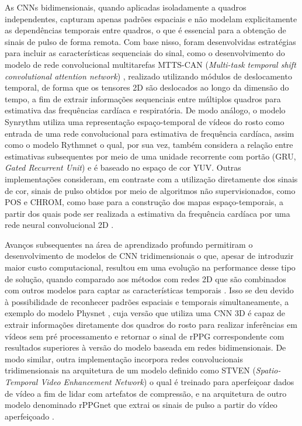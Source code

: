 As CNNs bidimensionais, quando aplicadas isoladamente a quadros independentes, capturam apenas padrões espaciais e não modelam explicitamente as dependências temporais entre quadros, o que é essencial para a obtenção de sinais de pulso de forma remota. Com base nisso, foram desenvolvidas estratégias para incluir as características sequenciais do sinal, como o desenvolvimento do modelo de rede convolucional multitarefas MTTS-CAN (\textit{Multi-task temporal shift convolutional attention network}) \cite{liu2020multi}, realizado utilizando módulos de deslocamento temporal, de forma que os tensores 2D são deslocados ao longo da dimensão do tempo, a fim de extrair informações sequenciais entre múltiplos quadros para estimativa das frequências cardíaca e respiratória. De modo análogo, o modelo Synrythm \cite{niu2018synrhythm} utiliza uma representação espaço-temporal de vídeos do rosto como entrada de uma rede convolucional para estimativa de frequência cardíaca, assim como o modelo Rythmnet \cite{niu2019rhythmnet} o qual, por sua vez, também considera a relação entre estimativas subsequentes por meio de uma unidade recorrente com portão (GRU, \textit{Gated Recurrent Unit}) e é baseado no espaço de cor YUV. Outras implementações consideram, em contraste com a utilização diretamente dos sinais de cor, sinais de pulso obtidos por meio de algoritmos não supervisionados, como POS e CHROM, como base para a construção dos mapas espaço-temporais, a partir dos quais pode ser realizada a estimativa da frequência cardíaca por uma rede neural convolucional 2D \cite{song2020heart, lu2021hr}. 

Avanços subsequentes na área de aprendizado profundo permitiram o desenvolvimento de modelos de CNN tridimensionais o que, apesar de introduzir maior custo computacional, resultou em uma evolução na performance desse tipo de solução, quando comparado aos métodos com redes 2D que são combinados com outros modelos para captar as características temporais \cite{yu2019physnet}. Isso se deu devido à possibilidade de reconhecer padrões espaciais e temporais simultaneamente, a exemplo do modelo Physnet \cite{yu2019physnet}, cuja versão que utiliza uma CNN 3D é capaz de extrair informações diretamente dos quadros do rosto para realizar inferências em vídeos sem pré processamento e retornar o sinal de rPPG correspondente com resultados superiores à versão do modelo baseada em redes bidimensionais. De modo similar, outra implementação incorpora redes convolucionais tridimensionais na arquitetura de um modelo definido como STVEN (\textit{Spatio-Temporal Video Enhancement Network}) o qual é treinado para aperfeiçoar dados de vídeo a fim de lidar com artefatos de compressão, e na arquitetura de outro modelo denominado rPPGnet que extrai os sinais de pulso a partir do vídeo aperfeiçoado \cite{yu2019stvenrppgnet}. 

